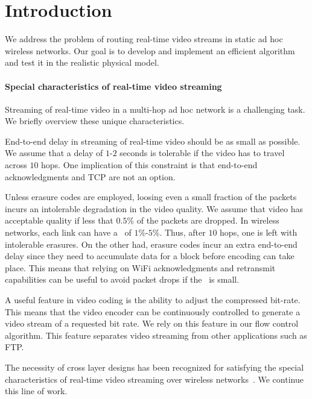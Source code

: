 \documentclass[12pt]{article}
\newenvironment{proof sketch}[1]{\noindent {\emph{Proof sketch of #1:}}}{\hfill \qed}
\newcommand{\PER}{\text{\sc{per}}}
\begin{document}
\section{Introduction}

We address the problem of routing real-time video streams in static ad
hoc wireless networks.  Our goal is to develop and implement an
efficient algorithm and test it in the realistic physical model.

\paragraph{Special characteristics of real-time video streaming}
Streaming of real-time video in a multi-hop ad hoc network is a
challenging task.  We briefly overview these unique characteristics.
\begin{inparaenum}[(1)]
\item End-to-end delay in streaming of real-time video should be as
  small as possible.  We assume that a delay of $1$-$2$ seconds is
  tolerable if the video has to travel across $10$ hops.  One
  implication of this constraint is that end-to-end acknowledgments and TCP are
  not an option.
\item Unless erasure codes are employed, loosing even a small fraction
  of the packets incurs an intolerable degradation in the video
  quality. We assume that video has acceptable quality if less that
  $0.5\%$ of the packets are dropped. In wireless networks, each link
  can have a \PER\ of $1\%$-$5\%$. Thus, after $10$ hops, one is left
  with intolerable erasures.  On the other had, erasure codes incur an
  extra end-to-end delay since they need to accumulate data for a
  block before encoding can take place. This means that relying on
  WiFi acknowledgments and retransmit capabilities can be useful to
  avoid packet drops if the \PER\ is small.
\item A useful feature in video coding is the ability to adjust the
  compressed bit-rate. This means that the video encoder can be
  continuously controlled to generate a video stream of a requested
  bit rate. We rely on this feature in our flow control algorithm.
  This feature separates video streaming from other applications such
  as FTP.
\end{inparaenum}
The necessity of cross layer designs has been recognized for
satisfying the special characteristics of real-time video streaming
over wireless
networks~\cite{shan2005cross,setton2005cross,khan2006application}.  We
continue this line of work.
\end{document}
